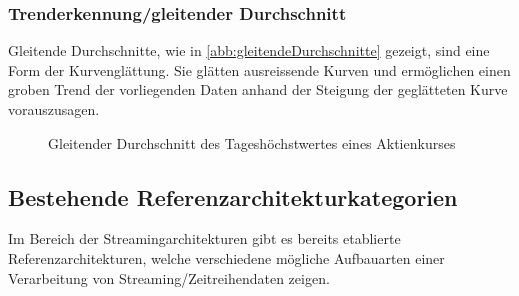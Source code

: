 \subsubsection{Trenderkennung/gleitender Durchschnitt}
Gleitende Durchschnitte, wie in \autoref{abb:gleitendeDurchschnitte} gezeigt, sind eine Form der Kurvenglättung. Sie glätten ausreissende Kurven und ermöglichen einen groben Trend der vorliegenden Daten anhand der Steigung der geglätteten Kurve vorauszusagen.
\begin{figure}[H]
\centering
{}
\caption{Gleitender Durchschnitt des Tageshöchstwertes eines Aktienkurses}
\label{abb:gleitendeDurchschnitte}
\end{figure}






\subsection{Bestehende Referenzarchitekturkategorien}\label{chap:bestehende_ras}
Im Bereich der Streamingarchitekturen gibt es bereits etablierte Referenzarchitekturen, welche verschiedene mögliche Aufbauarten einer Verarbeitung von Streaming/Zeitreihendaten zeigen.

